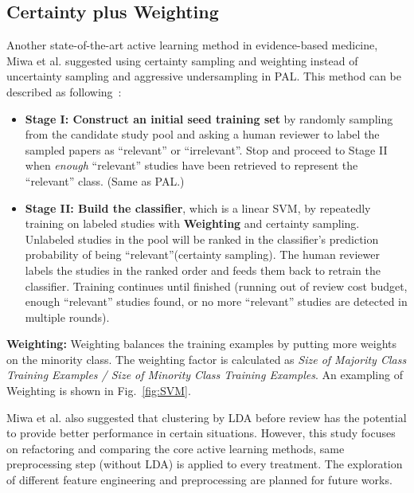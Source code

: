 \documentclass{svjour3}
\theoremstyle{break}
\begin{document}
\subsection{Certainty plus Weighting}
\label{sect: Certainty plus Weighting}

Another state-of-the-art active learning method in evidence-based medicine, Miwa et al. suggested using certainty sampling and weighting instead of uncertainty sampling and aggressive undersampling in PAL. This method can be described as following~\cite{miwa2014reducing}:

\begin{itemize}

\item
{\bf Stage I: Construct an initial seed training set} by randomly sampling from the candidate study pool and asking a human reviewer to label the sampled papers as ``relevant'' or ``irrelevant''. Stop and proceed to Stage II when \textit{enough} ``relevant'' studies have been retrieved to represent the ``relevant'' class. (Same as PAL.)

\item
{\bf Stage II: Build the classifier}, which is a linear SVM, by repeatedly training on labeled studies with \textbf{Weighting} and certainty sampling. Unlabeled studies in the pool will be ranked in the classifier's prediction probability of being ``relevant''(certainty sampling). The human reviewer labels the studies in the ranked order and feeds them back to retrain the classifier. Training continues until finished (running out of review cost budget, enough ``relevant'' studies found, or no more ``relevant'' studies are detected in multiple rounds).

\end{itemize}

{\bf Weighting: }Weighting balances the training examples by putting more weights on the minority class. The weighting factor is calculated as \emph{Size of Majority Class Training Examples / Size of Minority Class Training Examples}. An exampling of Weighting is shown in Fig.~\ref{fig:SVM}.

Miwa et al. also suggested that clustering by LDA before review has the potential to provide better performance in certain situations. However, this study focuses on refactoring and comparing the core active learning methods, same preprocessing step (without LDA) is applied to every treatment. The exploration of different feature engineering and preprocessing are planned for future works.
\end{document}
